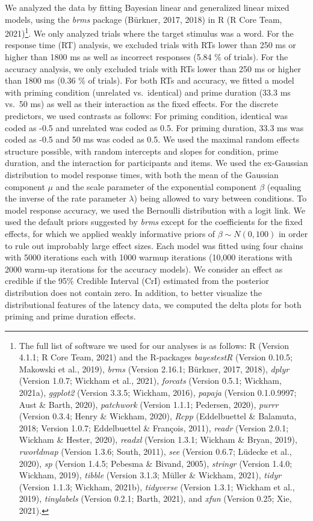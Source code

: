 \documentclass[
  english,
  man,floatsintext]{apa6}
\begin{document}
We analyzed the data by fitting Bayesian linear and generalized linear mixed models, using the \emph{brms} package (Bürkner, 2017, 2018) in R (R Core Team, 2021)\footnote{The full list of software we used for our analyses is as follows: R (Version 4.1.1; R Core Team, 2021) and the R-packages \emph{bayestestR} (Version 0.10.5; Makowski et al., 2019), \emph{brms} (Version 2.16.1; Bürkner, 2017, 2018), \emph{dplyr} (Version 1.0.7; Wickham et al., 2021), \emph{forcats} (Version 0.5.1; Wickham, 2021a), \emph{ggplot2} (Version 3.3.5; Wickham, 2016), \emph{papaja} (Version 0.1.0.9997; Aust \& Barth, 2020), \emph{patchwork} (Version 1.1.1; Pedersen, 2020), \emph{purrr} (Version 0.3.4; Henry \& Wickham, 2020), \emph{Rcpp} (Eddelbuettel \& Balamuta, 2018; Version 1.0.7; Eddelbuettel \& François, 2011), \emph{readr} (Version 2.0.1; Wickham \& Hester, 2020), \emph{readxl} (Version 1.3.1; Wickham \& Bryan, 2019), \emph{rworldmap} (Version 1.3.6; South, 2011), \emph{see} (Version 0.6.7; Lüdecke et al., 2020), \emph{sp} (Version 1.4.5; Pebesma \& Bivand, 2005), \emph{stringr} (Version 1.4.0; Wickham, 2019), \emph{tibble} (Version 3.1.3; Müller \& Wickham, 2021), \emph{tidyr} (Version 1.1.3; Wickham, 2021b), \emph{tidyverse} (Version 1.3.1; Wickham et al., 2019), \emph{tinylabels} (Version 0.2.1; Barth, 2021), and \emph{xfun} (Version 0.25; Xie, 2021).}. We only analyzed trials where the target stimulus was a word. For the response time (RT) analysis, we excluded trials with RTs lower than 250 ms or higher than 1800 ms as well as incorrect responses (5.84 \% of trials). For the accuracy analysis, we only excluded trials with RTs lower than 250 ms or higher than 1800 ms (0.36 \% of trials). For both RTs and accuracy, we fitted a model with priming condition (unrelated vs.~identical) and prime duration (33.3 ms vs.~50 ms) as well as their interaction as the fixed effects. For the discrete predictors, we used contrasts as follows: For priming condition, identical was coded as -0.5 and unrelated was coded as 0.5. For priming duration, 33.3 ms was coded as -0.5 and 50 ms was coded as 0.5. We used the maximal random effects structure possible, with random intercepts and slopes for condition, prime duration, and the interaction for participants and items. We used the ex-Gaussian distribution to model response times, with both the mean of the Gaussian component \(\mu\) and the scale parameter of the exponential component \(\beta\) (equaling the inverse of the rate parameter \(\lambda\)) being allowed to vary between conditions. To model response accuracy, we used the Bernoulli distribution with a logit link. We used the default priors suggested by \emph{brms} except for the coefficients for the fixed effects, for which we applied weakly informative priors of \(\beta \sim N(0,100)\) in order to rule out improbably large effect sizes. Each model was fitted using four chains with 5000 iterations each with 1000 warmup iterations (10,000 iterations with 2000 warm-up iterations for the accuracy models). We consider an effect as credible if the 95\% Credible Interval (CrI) estimated from the posterior distribution does not contain zero. In addition, to better visualize the distributional features of the latency data, we computed the delta plots for both priming and prime duration effects.
\end{document}
